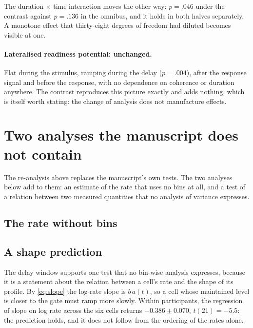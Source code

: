 \documentclass[a4paper,11pt]{article}
\newcommand{\1}{\mathbbm{1}}
\begin{document}
The duration $\times$ time interaction moves the other way: $p=.046$ under the contrast
against $p=.136$ in the omnibus, and it holds in both halves separately. A monotone
effect that thirty-eight degrees of freedom had diluted becomes visible at one.

\paragraph{Lateralised readiness potential: unchanged.} Flat during the stimulus,
ramping during the delay ($p=.004$), after the response signal and before the response,
with no dependence on coherence or duration anywhere. The contrast reproduces this
picture exactly and adds nothing, which is itself worth stating: the change of analysis
does not manufacture effects.

\section{Two analyses the manuscript does not contain}
\label{sec:extra}

The re-analysis above replaces the manuscript's own tests. The two analyses below
add to them: an estimate of the rate that uses no bins at all, and a test of a
relation between two measured quantities that no analysis of variance expresses.

\subsection{The rate without bins}
\label{sec:estim}


\subsection{A shape prediction}

The delay window supports one test that no bin-wise analysis expresses, because it is a
statement about the relation between a cell's rate and the shape of its profile. By
\eqref{eq:slope} the log-rate slope is $b\,a(t)$, so a cell whose maintained level is
closer to the gate must ramp more slowly. Within participants, the regression of slope on
log rate across the six cells returns $-0.386\pm0.070$, $t(21)=-5.5$: the prediction holds,
and it does not follow from the ordering of the rates alone.
\end{document}
